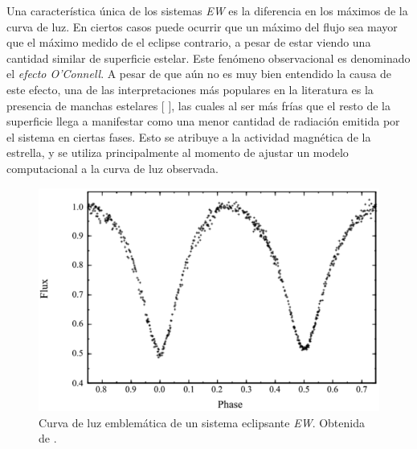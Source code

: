 Una característica única de los sistemas \textit{EW} es la diferencia en los
máximos de la curva de luz. En ciertos casos puede ocurrir que un máximo del
flujo sea mayor que el máximo medido de el eclipse contrario, a pesar de estar
viendo una cantidad similar de superficie estelar. Este fenómeno observacional
es denominado el \textit{efecto O'Connell}. A pesar de que aún no es muy bien
entendido la causa de este efecto, una de las interpretaciones más populares en
la literatura es la presencia de manchas estelares
[
], las cuales al ser más
frías que el resto de la superficie llega a manifestar como una menor cantidad
de radiación emitida por el sistema en ciertas fases. Esto se atribuye a la
actividad magnética de la estrella, y se utiliza principalmente al momento de
ajustar un modelo computacional a la curva de luz observada.

\begin{figure}[!ht]
	\centering
	\includegraphics[scale=0.63]{Introduccion/Figures/Figura EW Curva_Modelling of WUMa Stars.png}
	\caption{Curva de luz emblemática de un sistema eclipsante
	\textit{EW}. Obtenida de
	.}
	\label{figuraEWCurvaLuz}
\end{figure}
